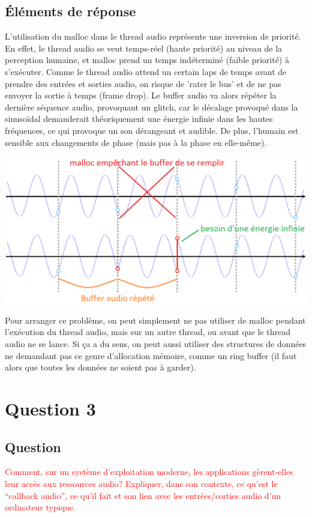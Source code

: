 \documentclass[letterpaper, 12pt]{article}
\newcommand{\alinea}{
\hspace*{0.5cm}}
\newcommand{\red}[1]{
	\textcolor{red}{#1}}
\begin{document}
		\subsection{\'Eléments de réponse}
			\alinea L'utilisation du malloc dans le thread audio représente une inversion de priorité. En effet, le thread audio se veut
				temps-réel (haute priorité) au niveau de la perception humaine, et malloc prend un temps indéterminé (faible priorité)
				à s'exécuter. Comme le thread audio attend un certain laps de temps avant de prendre des entrées et sorties audio,
				on risque de 'rater le bus' et de ne pas envoyer la sortie à temps (frame drop). Le buffer audio va alors répéter 
				la dernière	séquence audio, provoquant un glitch, car le décalage provoqué dans la sinusoïdal demanderait théoriquement 
				une énergie infinie dans les hautes fréquences, ce qui provoque un son dérangeant et audible. De plus, l'humain
				est sensible aux changements de phase (mais pas à la phase en elle-même).
			\begin{center}
				\includegraphics[width=5.25in]{Images/glitch}
			\end{center}
			\alinea Pour arranger ce problème, on peut simplement ne pas utiliser de malloc pendant l'exécution du thread audio, mais 
				sur un autre thread, ou avant que le thread audio ne se lance. Si ça a du sens, on peut aussi utiliser des structures 
				de données ne demandant pas ce genre d'allocation mémoire, comme un ring buffer (il faut alors que toutes les données
				ne soient pas à garder).
	\section{Question 3}
		\subsection{Question}
			\alinea \red{Comment, sur un système d’exploitation moderne, les applications gèrent-elles leur accès aux ressources audio? 
				Expliquer, dans son contexte, ce qu’est le “callback audio”, ce qu’il fait et son lien avec les entrées/sorties 
				audio d’un ordinateur typique.}
\end{document}
